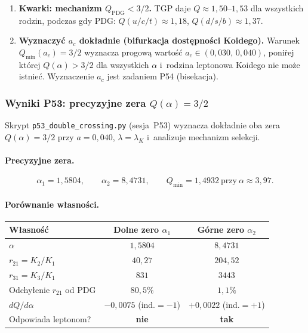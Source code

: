 \begin{enumerate}[label=\textbf{OP-\arabic*},leftmargin=3em]
  \item \textbf{Kwarki: mechanizm $Q_\mathrm{PDG}<3/2$.}
        TGP daje $Q\approx1{,}50$--$1{,}53$ dla wszystkich rodzin,
        podczas gdy PDG: $Q(u/c/t)\approx1{,}18$, $Q(d/s/b)\approx1{,}37$.

  \item[\textbf{OP-6}] \textbf{Wyznaczy\'c $a_c$ dok\l{}adnie
        (bifurkacja dost\k{e}pno\'sci Koidego).}
        Warunek $Q_{\min}(a_c)=3/2$ wyznacza progow\k{a} warto\'s\'c
        $a_c\in(0{,}030,\,0{,}040)$, poni\.rej kt\'orej $Q(\alpha)>3/2$
        dla wszystkich $\alpha$ i~rodzina leptonowa Koidego nie mo\.ze
        istnie\'c. Wyznaczenie $a_c$ jest zadaniem P54 (bisekacja).

\end{enumerate}

\subsubsection{Wyniki P53: precyzyjne zera $Q(\alpha)=3/2$}%
\label{app:F-P53}

Skrypt \texttt{p53\_double\_crossing.py} (sesja~P53) wyznacza dok\l{}adnie
oba zera $Q(\alpha)=3/2$ przy $a=0{,}040$, $\lambda=\lambda_K$
i~analizuje mechanizm selekcji.

\paragraph{Precyzyjne zera.}
\begin{equation}\label{eq:p53-zeros}
  \alpha_1 = 1{,}5804, \qquad \alpha_2 = 8{,}4731,
  \qquad Q_{\min} = 1{,}4932\ \text{przy}\ \alpha\approx3{,}97.
\end{equation}

\paragraph{Por\'ownanie w\l{}asno\'sci.}
\begin{center}
\begin{tabular}{lcc}
\toprule
W\l{}asno\'s\'c & Dolne zero $\alpha_1$ & G\'orne zero $\alpha_2$ \\\midrule
$\alpha$             & $1{,}5804$  & $8{,}4731$ \\
$r_{21}=K_2/K_1$     & $40{,}27$   & $204{,}52$ \\
$r_{31}=K_3/K_1$     & $831$       & $3443$ \\
Odchy\l{}enie $r_{21}$ od PDG & $80{,}5\%$ & $1{,}1\%$ \\
$dQ/d\alpha$         & $-0{,}0075$ (ind.$=-1$) & $+0{,}0022$ (ind.$=+1$)\\
Odpowiada leptonom?  & \textbf{nie} & \textbf{tak}\\\bottomrule
\end{tabular}
\end{center}

